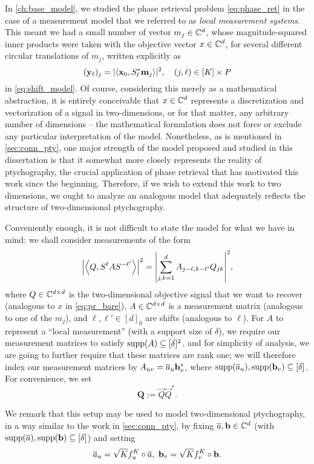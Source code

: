 In \cref{ch:base_model}, we studied the phase retrieval problem \eqref{eq:phase_ret} in the case of a measurement model that we referred to as \emph{local measurement systems}.  This meant we had a small number of vector $m_j \in \mathbb{C}^d$, whose magnitude-squared inner products were taken with the objective vector $x \in \mathbb{C}^d$, for several different circular translations of $m_j$, written explicitly as \[ (\mathbf{y}_\ell)_j = |\langle \mathbf{x}_0, S^*_\ell \mathbf{m}_j \rangle|^2, \quad (j, \ell) \in [K] \times P\] in \eqref{eq:shift_model}.  Of course, considering this merely as a mathematical abstraction, it is entirely conceivable that $x \in \mathbb{C}^d$ represents a discretization and vectorization of a signal in two-dimensions, or for that matter, any arbitrary number of dimensions -- the mathematical formulation does not force or exclude any particular interpretation of the model.  Nonetheless, as is mentioned in \cref{sec:conn_pty}, one major strength of the model proposed and studied in this dissertation is that it somewhat more closely represents the reality of ptychography, the crucial application of phase retrieval that has motivated this work since the beginning.  Therefore, if we wish to extend this work to two dimensions, we ought to analyze an analogous model that adequately reflects the structure of two-dimensional ptychography.

Conveniently enough, it is not difficult to state the model for what we have in mind: we shall consider measurements of the form \begin{equation} \abs*{\inner*{Q, S^{\ell} A S^{-\ell'}}}^2 = \abs*{\sum_{j, k = 1}^d A_{j - \ell, k - \ell'} Q_{jk}}^2, \label{eq:2d_meas} \end{equation} where $Q \in \mathbb{C}^{d \times d}$ is the two-dimensional objective signal that we want to recover (analogous to $x$ in \eqref{eq:pr_bare}), $A \in \mathbb{C}^{d \times d}$ is a measurement matrix (analogous to one of the $m_j$), and $\ell, \ell' \in [d]_0$ are shifts (analogous to $\ell$).  For $A$ to represent a ``local measurement'' (with a support size of $\delta$), we require our measurement matrices to satisfy $\operatorname{supp}(A) \subseteq [\delta]^2$, and for simplicity of analysis, we are going to further require that these matrices are rank one; we will therefore index our measurement matrices by $A_{uv} = \overline{a}_u \mathbf b_v^*$, where $\operatorname{supp}(\overline{a}_u), \operatorname{supp}(\mathbf b_v) \subseteq [\delta]$.  For convenience, we set \begin{equation} \mathbf{Q} := \vec Q \vec Q ^*. \label{eq:vecQ} \end{equation}

We remark that this setup may be used to model two-dimensional ptychography, in a way similar to the work in \cref{sec:conn_pty}, by fixing $\overline{a}, \mathbf b \in \mathbb{C}^d$ (with $\operatorname{supp}(\overline{a}), \operatorname{supp}(\mathbf b) \subseteq [\delta]$) and setting \[\a_u = \sqrt{K} f_u^K \circ \a, \ \b_v = \sqrt{K} f_v^K \circ \b.\]
  
